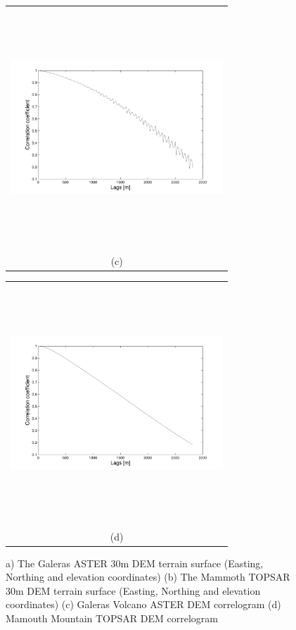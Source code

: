 \documentclass[12pt]{article}
\newcommand{\Pic}[2][0.85]{\begin{center}\texttt{[image: \#2]}
 \end{center} }
\begin{document}
\begin{figure}[H]
\begin{minipage}{0.6\textwidth}
    \end{minipage} 
    \begin{minipage}[b]{0.6\textwidth}
        \begin{tabular}{c}
       \includegraphics[width=8cm,height=9cm,keepaspectratio]{GalerasAsterCut_correlogram_line.pdf}\\
        (c)
        \end{tabular}
    \end{minipage}
    \begin{minipage}{0.6\textwidth}
        \begin{tabular}{c}
	\includegraphics[width=8cm,height=9cm,keepaspectratio]{Mammoth30mCut_correlogram_line.pdf}\\
        (d)
        \end{tabular}
    \end{minipage} 

    \caption{a) The Galeras ASTER 30m DEM terrain surface (Easting,
      Northing and elevation coordinates) (b) The Mammoth TOPSAR 30m DEM
      terrain surface (Easting, Northing and elevation coordinates) (c)
      Galeras Volcano ASTER DEM correlogram (d) Mamouth Mountain
      TOPSAR DEM correlogram}
\label{fig2}  
\end{figure}
\end{document}
